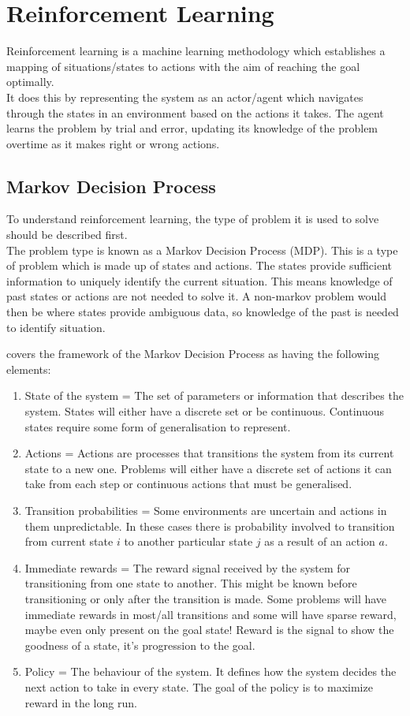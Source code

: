 \documentclass{report}
\begin{document}
\section{Reinforcement Learning}

Reinforcement learning is a machine learning methodology which establishes a mapping of situations/states to actions with the aim of reaching the goal optimally.\\
It does this by representing the system as an actor/agent which navigates through the states in an environment based on the actions it takes. The agent learns the problem by 
trial and error, updating its knowledge of the problem overtime as it makes right or wrong actions.

\subsection{Markov Decision Process}

To understand reinforcement learning, the type of problem it is used to solve should be described first.\\
The problem type is known as a Markov Decision Process (MDP). This is a type of problem which is made up of states and actions. The states provide sufficient 
information to uniquely identify the current situation. This means knowledge of past states or actions are not needed to solve it. A non-markov problem would 
then be where states provide ambiguous data, so knowledge of the past is needed to identify situation.

\citep{gosavi2011tutorial} covers the framework of the Markov Decision Process as having the following elements: 
\begin{enumerate}
	\item State of the system = The set of parameters or information that describes the system. States will either have a discrete set or be continuous. Continuous states require some form of generalisation to represent.
	\item Actions = Actions are processes that transitions the system from its current state to a new one. Problems will either have a discrete set of actions it can take 
	from each step or continuous actions that must be generalised.
	\item Transition probabilities = Some environments are uncertain and actions in them unpredictable. In these cases there is probability involved to transition from current state $i$ to another particular state $j$ as a result of an action $a$.
	\item Immediate rewards = The reward signal received by the system for transitioning from one state to another. This might be known before transitioning or only after 
	the transition is made. Some problems will have immediate rewards in most/all transitions and some will have sparse reward, maybe even only present on the goal state!
	Reward is the signal to show the goodness of a state, it's progression to the goal.
	\item Policy = The behaviour of the system. It defines how the system decides the next action to take in every state. The goal of the policy is to maximize reward in the long run.
\end{enumerate}
\end{document}
